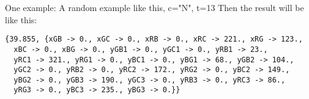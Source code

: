 One example:
A random example like this, c="N", t=13
Then the result will be like this:
{\scriptsize \begin{lstlisting}
{39.855, {xGB -> 0., xGC -> 0., xRB -> 0., xRC -> 221., xRG -> 123., 
  xBC -> 0., xBG -> 0., yGB1 -> 0., yGC1 -> 0., yRB1 -> 23., 
  yRC1 -> 321., yRG1 -> 0., yBC1 -> 0., yBG1 -> 68., yGB2 -> 104., 
  yGC2 -> 0., yRB2 -> 0., yRC2 -> 172., yRG2 -> 0., yBC2 -> 149., 
  yBG2 -> 0., yGB3 -> 190., yGC3 -> 0., yRB3 -> 0., yRC3 -> 86., 
  yRG3 -> 0., yBC3 -> 235., yBG3 -> 0.}}
\end{lstlisting}
}